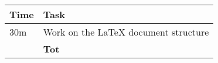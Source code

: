 \begin{center}
    {\renewcommand{\arraystretch}{2}%
    \begin{tabular}{L{2cm}L{12cm}}
        \hline
        \textbf{Time} & \textbf{Task} \\
        \hline
        30m & Work on the LaTeX document structure \\
        \hline
        \textbf{} & \textbf{Tot} \\
    \end{tabular}}
\end{center}